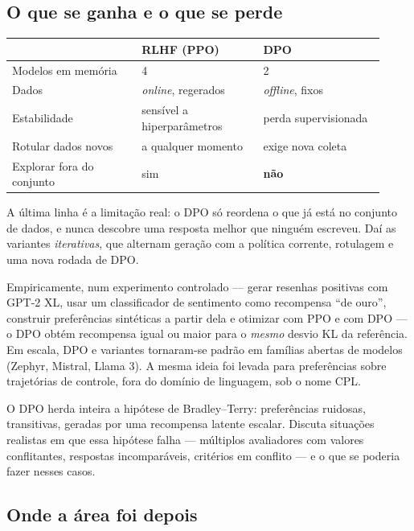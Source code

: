 \documentclass[11pt, a4paper]{article}
\begin{document}
\subsection{O que se ganha e o que se perde}

\begin{center}\small
\begin{tabular}{@{}p{0.32\linewidth}p{0.3\linewidth}p{0.3\linewidth}@{}}
\toprule
& \textbf{RLHF (PPO)} & \textbf{DPO}\\
\midrule
Modelos em memória & 4 & 2\\
Dados & \emph{online}, regerados & \emph{offline}, fixos\\
Estabilidade & sensível a hiperparâmetros & perda supervisionada\\
Rotular dados novos & a qualquer momento & exige nova coleta\\
Explorar fora do conjunto & sim & \textbf{não}\\
\bottomrule
\end{tabular}
\end{center}

A última linha é a limitação real: o DPO só reordena o que já está no conjunto de
dados, e nunca descobre uma resposta melhor que ninguém escreveu. Daí as
variantes \emph{iterativas}, que alternam geração com a política corrente,
rotulagem e uma nova rodada de DPO.

Empiricamente, num experimento controlado --- gerar resenhas positivas com
GPT-2 XL, usar um classificador de sentimento como recompensa ``de ouro'',
construir preferências sintéticas a partir dela e otimizar com PPO e com DPO ---
o DPO obtém recompensa igual ou maior para o \emph{mesmo} desvio KL da
referência. Em escala, DPO e variantes tornaram-se padrão em famílias abertas de
modelos (Zephyr, Mistral, Llama 3). A mesma ideia foi levada para preferências
sobre trajetórias de controle, fora do domínio de linguagem, sob o nome CPL.

\begin{discbox}
O DPO herda inteira a hipótese de Bradley--Terry: preferências ruidosas,
transitivas, geradas por uma recompensa latente escalar. Discuta situações
realistas em que essa hipótese falha --- múltiplos avaliadores com valores
conflitantes, respostas incomparáveis, critérios em conflito --- e o que se
poderia fazer nesses casos.
\end{discbox}

\subsection{Onde a área foi depois}
\end{document}
